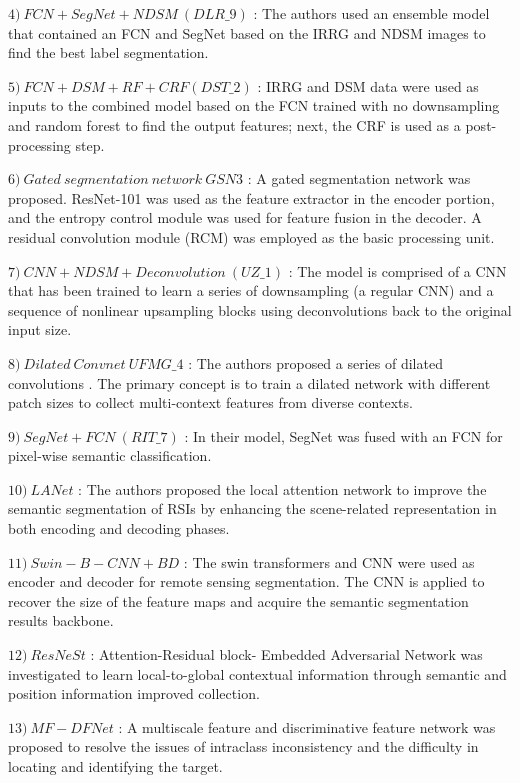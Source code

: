 \documentclass[journal]{IEEEtran}
\begin{document}
$4)	~FCN+SegNet+NDSM ~(DLR\_9)$ \cite{MARMANIS2018158}: The authors used an ensemble model that contained an FCN and SegNet based on the IRRG and NDSM images to find the best label segmentation.

$5)	~FCN+DSM+RF+CRF (DST\_2)$ \cite{7301381}: IRRG and DSM data were used as inputs to the combined model based on the FCN trained with no downsampling and random forest to find the output features; next, the CRF is used as a post-processing step.

$6)	~Gated~segmentation~network~GSN3$ \cite{https://doi.org/10.48550/arxiv.1606.02585}: A gated segmentation network was proposed. ResNet{-}101 was used as the feature extractor in the encoder portion, and the entropy control module was used for feature fusion in the decoder. A residual convolution module (RCM) was employed as the basic processing unit.

$7)	~CNN+NDSM+Deconvolution~(UZ\_1)$ \cite{rs9050446}: The model is comprised of a CNN that has been trained to learn a series of downsampling (a regular CNN) and a sequence of nonlinear upsampling blocks using deconvolutions back to the original input size.

$8)	~Dilated~Convnet~ UFMG\_4$ \cite{7725499}: The authors proposed a series of dilated convolutions \cite{8727958}. The primary concept is to train a dilated network with different patch sizes to collect multi-context features from diverse contexts.

$9)	~SegNet+FCN~ (RIT\_7)$ \cite{10.1007/978-3-642-75988-8_28}: In their model, SegNet was fused with an FCN for pixel-wise semantic classification.

$10) ~LANet$ \cite{9102424}: The authors proposed the local attention network to improve the semantic segmentation of RSIs by enhancing the scene-related representation in both encoding and decoding phases.

$11) ~Swin-B-CNN+BD$ \cite{9686732}: The swin transformers and CNN were used as encoder and decoder for remote sensing segmentation. The CNN is applied to recover the size of the feature maps and acquire the semantic segmentation results backbone.

$12) ~ResNeSt$ \cite{doi:10.1080/2150704X.2021.1910362}: Attention-Residual block- Embedded Adversarial Network was investigated to learn local-to-global contextual information through semantic and position information improved collection.

$13)~MF-DFNet$ \cite{doi:10.1080/01431161.2021.2018147}: A multiscale feature and discriminative feature network was proposed to resolve the issues of intraclass inconsistency and the difficulty in locating and identifying the target.
\end{document}
